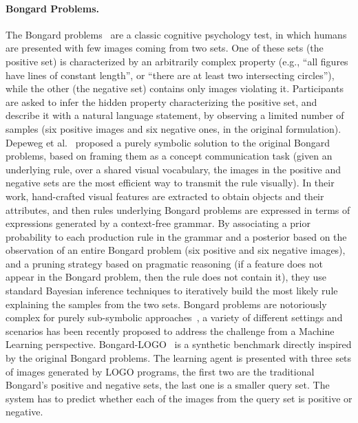 \paragraph{Bongard Problems.}
The Bongard problems~\cite{bongard1970pattern} are a classic cognitive psychology test, in which humans are presented with few images coming from two sets. One of these sets (the positive set) is characterized by an arbitrarily complex property (e.g., ``all figures have lines of constant length'', or ``there are at least two intersecting circles''), while the other (the negative set) contains only images violating it.
Participants are asked to infer the hidden property characterizing the positive set, and describe it with a natural language statement, by observing a limited number of samples (six positive images and six negative ones, in the original formulation).
%
Depeweg et al.~\cite{depeweg2018solving} proposed a purely symbolic solution to the original Bongard problems, based on framing them as a concept communication task (given an underlying rule, over a shared visual vocabulary, the images in the positive and negative sets are the most efficient way to transmit the rule visually). In their work, hand-crafted visual features are extracted to obtain objects and their attributes, and then rules underlying Bongard problems are expressed in terms of expressions generated by a context-free grammar.
By associating a prior probability to each production rule in the grammar and a posterior based on the observation of an entire Bongard problem (six positive and six negative images), and a pruning strategy based on pragmatic reasoning (if a feature does not appear in the Bongard problem, then the rule does not contain it), they use standard Bayesian inference techniques to iteratively build the most likely rule explaining the samples from the two sets.
%
Bongard problems are notoriously complex for purely sub-symbolic approaches~\cite{yun2020deeper}, a variety of different settings and scenarios has been recently proposed to address the challenge from a Machine Learning perspective.
%
Bongard-LOGO~\cite{nie2020bongard} is a synthetic benchmark directly inspired by the original Bongard problems. %
The learning agent is presented with three sets of images generated by LOGO programs, the first two are the traditional Bongard's positive and negative sets, the last one is a smaller query set. The system has to predict whether each of the images from the query set is positive or negative.
